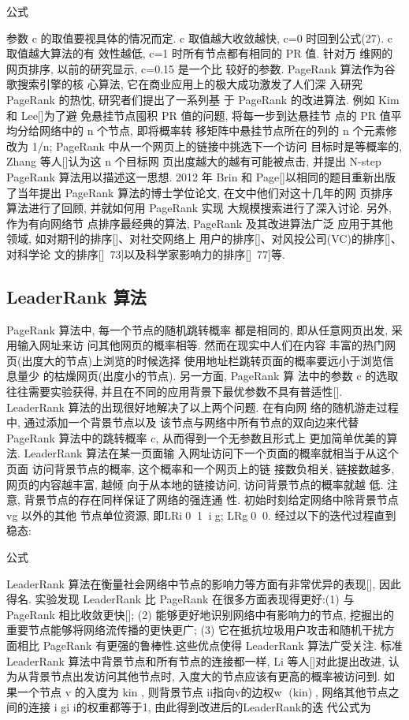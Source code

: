 			公式 

			参数 c 的取值要视具体的情况而定. c 取值越大收敛越快, c=0 时回到公式(27). c 取值越大算法的有 效性越低, c=1 时所有节点都有相同的 PR 值. 针对万 维网的网页排序, 以前的研究显示, c=0.15 是一个比 较好的参数. PageRank 算法作为谷歌搜索引擎的核 心算法, 它在商业应用上的极大成功激发了人们深 入研究 PageRank 的热忱, 研究者们提出了一系列基 于 PageRank 的改进算法. 例如 Kim 和 Lee[]为了避 免悬挂节点囤积 PR 值的问题, 将每一步到达悬挂节 点的 PR 值平均分给网络中的 n 个节点, 即将概率转 移矩阵中悬挂节点所在的列的 n 个元素修改为 1/n; PageRank 中从一个网页上的链接中挑选下一个访问 目标时是等概率的, Zhang 等人[]认为这 n 个目标网 页出度越大的越有可能被点击, 并提出 N-step PageRank 算法用以描述这一思想. 2012 年 Brin 和 Page[]以相同的题目重新出版了当年提出 PageRank 算法的博士学位论文, 在文中他们对这十几年的网 页排序算法进行了回顾, 并就如何用 PageRank 实现 大规模搜索进行了深入讨论. 另外, 作为有向网络节 点排序最经典的算法, PageRank 及其改进算法广泛 应用于其他领域, 如对期刊的排序[]、对社交网络上 用户的排序[]、对风投公司(VC)的排序[]、对科学论 文的排序[]~73]以及科学家影响力的排序[]~77]等.
\subsection{LeaderRank 算法}
PageRank 算法中, 每一个节点的随机跳转概率 都是相同的, 即从任意网页出发, 采用输入网址来访 问其他网页的概率相等. 然而在现实中人们在内容 丰富的热门网页(出度大的节点)上浏览的时候选择 使用地址栏跳转页面的概率要远小于浏览信息量少 的枯燥网页(出度小的节点). 另一方面, PageRank 算 法中的参数 c 的选取往往需要实验获得, 并且在不同的应用背景下最优参数不具有普适性[]. LeaderRank 算法的出现很好地解决了以上两个问题. 在有向网 络的随机游走过程中, 通过添加一个背景节点以及 该节点与网络中所有节点的双向边来代替 PageRank 算法中的跳转概率 c, 从而得到一个无参数且形式上 更加简单优美的算法. LeaderRank 算法在某一页面输 入网址访问下一个页面的概率就相当于从这个页面 访问背景节点的概率, 这个概率和一个网页上的链 接数负相关, 链接数越多, 网页的内容越丰富, 越倾 向于从本地的链接访问, 访问背景节点的概率就越 低. 注意, 背景节点的存在同样保证了网络的强连通 性. 初始时刻给定网络中除背景节点 vg 以外的其他 节点单位资源, 即LRi01，ig; LRg00. 经过以下的迭代过程直到稳态:

			公式

			LeaderRank 算法在衡量社会网络中节点的影响力等方面有非常优异的表现[], 因此得名. 实验发现 LeaderRank 比 PageRank 在很多方面表现得更好:(1) 与 PageRank 相比收敛更快[]; (2) 能够更好地识别网络中有影响力的节点, 挖掘出的重要节点能够将网络流传播的更快更广; (3) 它在抵抗垃圾用户攻击和随机干扰方面相比 PageRank 有更强的鲁棒性.这些优点使得 LeaderRank 算法广受关注. 标准LeaderRank 算法中背景节点和所有节点的连接都一样, Li 等人[]对此提出改进, 认为从背景节点出发访问其他节点时, 入度大的节点应该有更高的概率被访问到. 如果一个节点 v 的入度为 kin , 则背景节点 ii指向v的边权w (kin), 网络其他节点之间的连接 i gi i的权重都等于1, 由此得到改进后的LeaderRank的迭 代公式为

